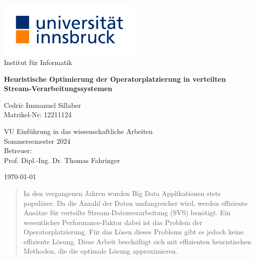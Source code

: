 \documentclass{article}
\begin{document}
\begin{titlepage}
      \begin{center}
          \Huge
          \vspace{1cm} %
          
          
          \includegraphics[width=7cm]{res/universitaet-innsbruck-logo.jpg} \\
          \Large
          Institut f\"ur Informatik \\
          \vspace{1cm}

          \Huge
          \textbf{Heuristische Optimierung der Operatorplatzierung in verteilten Stream-Verarbeitungssystemen} \\
          \vspace{3cm} %

          \Large
          Cedric Immanuel Sillaber \\
          Matrikel-Nr: 12211124
          
          \vspace{1cm}
          \large
          VU Einführung in das wissenschaftliche Arbeiten \\
          Sommersemester 2024\\
          \vspace{4cm}
          \normalsize
          Betreuer:\\ Prof. Dipl.-Ing. Dr. Thomas Fahringer
          
          \vfill 
          
          \large
          \today
      \end{center}
  \end{titlepage}
\begin{abstract}
In den vergangenen Jahren wurden Big Data Applikationen stets populärer. 
Da die Anzahl der Daten umfangreicher wird, werden effiziente Ansätze für 
verteilte Stream-Datenverarbeitung (SVS) benötigt.
Ein wesentlicher Performance-Faktor dabei ist das Problem der Operatorplatzierung.
Für das Lösen dieses Problems gibt es jedoch keine 
effiziente Lösung. Diese Arbeit beschäftigt sich mit effizienten heuristischen Methoden, die die optimale Lösung approximieren. 
\end{abstract}
\end{document}
